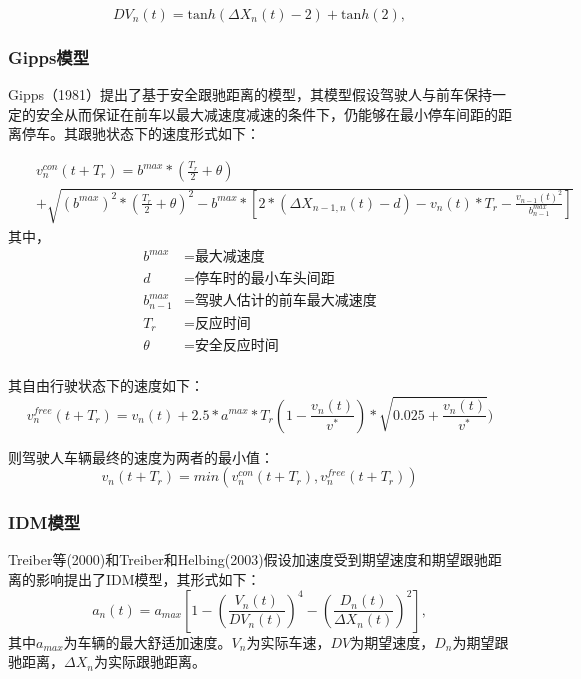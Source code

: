 \begin{equation}
DV_n(t)=\mathrm{tan}h(\Delta X_n(t)-2)+\mathrm{tan}h(2),
\end{equation}

\subsubsection{Gipps模型}
Gipps（1981）\cite{Gipps1981}提出了基于安全跟驰距离的模型，其模型假设驾驶人与前车保持一定的安全从而保证在前车以最大减速度减速的条件下，仍能够在最小停车间距的距离停车。其跟驰状态下的速度形式如下：

\begin{eqnarray}
&&v_n^{con}(t+T_r)=b^{max}*(\frac{T_r}{2}+\theta)\nonumber\\
&&+\sqrt{(b^{max})^2*(\frac{T_r}{2}+\theta)^2-b^{max}*[2*(\Delta X_{n-1,n}(t)-d)-v_n(t)*T_r-\frac{v_{n-1}(t)^2}{b_{n-1}^{max}}]}
\end{eqnarray}
其中，
\begin{displaymath}
{\begin{aligned}
b^{max}&=\text{最大减速度}\\
d&=\text{停车时的最小车头间距}\\
b_{n-1}^{max}&=\text{驾驶人估计的前车最大减速度}\\
T_r&=\text{反应时间}\\
\theta&=\text{安全反应时间}\\
\end{aligned}}
\end{displaymath}

其自由行驶状态下的速度如下：
\begin{equation}
v_n^{free}(t+T_r)=v_n(t)+2.5*a^{max}*T_r(1-\frac{v_n(t)}{v^*})*\sqrt{0.025+\frac{v_n(t)}{v^*}})
\end{equation}

则驾驶人车辆最终的速度为两者的最小值：
\begin{equation}
v_n(t+T_r)=min(v_n^{con}(t+T_r),v_n^{free}(t+T_r))
\end{equation}

\subsubsection{IDM模型}
Treiber等(2000)\cite{Treiber2000}和Treiber和Helbing(2003)\cite{Treiber2003}假设加速度受到期望速度和期望跟驰距离的影响提出了IDM模型，其形式如下：
\begin{equation}
a_n(t)=a_{max}\left[1-\left(\frac{V_n(t)}{DV_n(t)}\right)^4-\left(\frac{D_n(t)}{\Delta X_n(t)}\right )^2\right],
\end{equation}
其中$a_{max}$为车辆的最大舒适加速度。$V_n$为实际车速，$DV$为期望速度，$D_n$为期望跟驰距离，$\Delta X_n$为实际跟驰距离。

